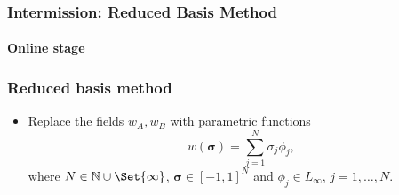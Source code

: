 \begin{frame}[t]
    \frametitle{Intermission: Reduced Basis Method}
    \framesubtitle{Online stage}

\end{frame}


\begin{frame}[t]
    \frametitle{Reduced basis method}

    \begin{itemize}
        \item Replace the fields $w_A, w_B$ with parametric functions
        \begin{equation}
            w(\bm \sigma) = \sum_{j = 1}^{N} \sigma_{j} \phi_{j},
        \end{equation}
        where $N \in \mathbb{N} \cup \Set{ \infty }$, $\bm \sigma \in [-1, 1]^{N}$ and $\phi_{j} \in L_{\infty}$, $j = 1, \dots, N$.
    \end{itemize}

\end{frame}
